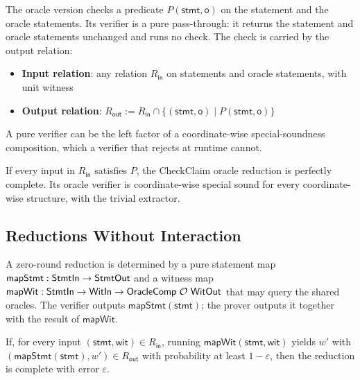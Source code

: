 \begin{definition}
    \label{def:checkclaim_oracle_reduction}
    The oracle version checks a predicate $P(\mathsf{stmt}, \mathsf{o})$ on the statement and the oracle statements. Its verifier is a pure pass-through: it returns the statement and oracle statements unchanged and runs no check. The check is carried by the output relation:
    \begin{itemize}
        \item \textbf{Input relation}: any relation $R_{\mathsf{in}}$ on statements and oracle statements, with unit witness
        \item \textbf{Output relation}: $R_{\mathsf{out}} := R_{\mathsf{in}} \cap \{(\mathsf{stmt}, \mathsf{o}) \mid P(\mathsf{stmt}, \mathsf{o})\}$
    \end{itemize}
    A pure verifier can be the left factor of a coordinate-wise special-soundness composition, which a verifier that rejects at runtime cannot.
    \leanok
\end{definition}

\begin{theorem}
    If every input in $R_{\mathsf{in}}$ satisfies $P$, the CheckClaim oracle reduction is perfectly complete. Its oracle verifier is coordinate-wise special sound for every coordinate-wise structure, with the trivial extractor.
    \leanok
\end{theorem}

\subsection{Reductions Without Interaction}

\begin{definition}
    \label{def:no_interaction_reduction}
    A zero-round reduction is determined by a pure statement map $\mathsf{mapStmt} : \mathsf{StmtIn} \to \mathsf{StmtOut}$ and a witness map $\mathsf{mapWit} : \mathsf{StmtIn} \to \mathsf{WitIn} \to \mathsf{OracleComp}\ \mathcal{O}\ \mathsf{WitOut}$ that may query the shared oracles. The verifier outputs $\mathsf{mapStmt}(\mathsf{stmt})$; the prover outputs it together with the result of $\mathsf{mapWit}$.
    \leanok
\end{definition}

\begin{theorem}
    If, for every input $(\mathsf{stmt}, \mathsf{wit}) \in R_{\mathsf{in}}$, running $\mathsf{mapWit}(\mathsf{stmt}, \mathsf{wit})$ yields $w'$ with $(\mathsf{mapStmt}(\mathsf{stmt}), w') \in R_{\mathsf{out}}$ with probability at least $1 - \varepsilon$, then the reduction is complete with error $\varepsilon$.
    \leanok
\end{theorem}
